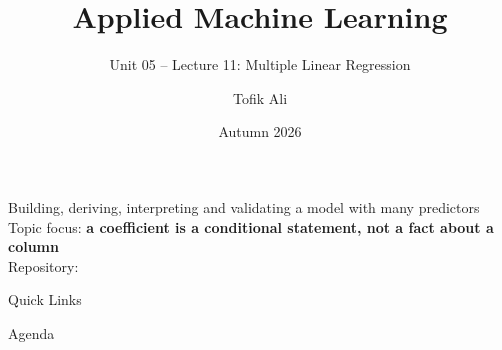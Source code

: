 \documentclass[aspectratio=169]{beamer}
\title[Applied Machine Learning]{Applied Machine Learning}
\subtitle{Unit 05 -- Lecture 11: Multiple Linear Regression}
\author{Tofik Ali}
\institute{School of Computer Science, UPES Dehradun}
\date{Autumn 2026}
\begin{document}
\UPESCoverFrame
\setcounter{framenumber}{0}

\begin{frame}
  \titlepage
  \begin{center}
    \footnotesize Building, deriving, interpreting and validating a model with
    many predictors\\[0.25em]
    \footnotesize Topic focus: \textbf{a coefficient is a conditional
    statement, not a fact about a column}\\[0.25em]
    \footnotesize Repository: \texttt{\AMLRepoURL}
  \end{center}
  \slidesources{\AMLUnitVSources}
\end{frame}

\begin{frame}{Quick Links}
  \centering
  \hyperlink{sec:model}{}\hspace{0.4em}
  \hyperlink{sec:derive}{}\hspace{0.4em}
  \hyperlink{sec:hand}{}\hspace{0.4em}
  \hyperlink{sec:interp}{}\hspace{0.4em}
  \hyperlink{sec:std}{}\hspace{0.4em}
  \hyperlink{sec:mc}{}\hspace{0.4em}
  \hyperlink{sec:missing}{}\hspace{0.4em}
  \hyperlink{sec:valid}{}\hspace{0.4em}
  \hyperlink{sec:summary}{}
\end{frame}

\begin{frame}{Agenda}
  \tableofcontents
\end{frame}
\end{document}
